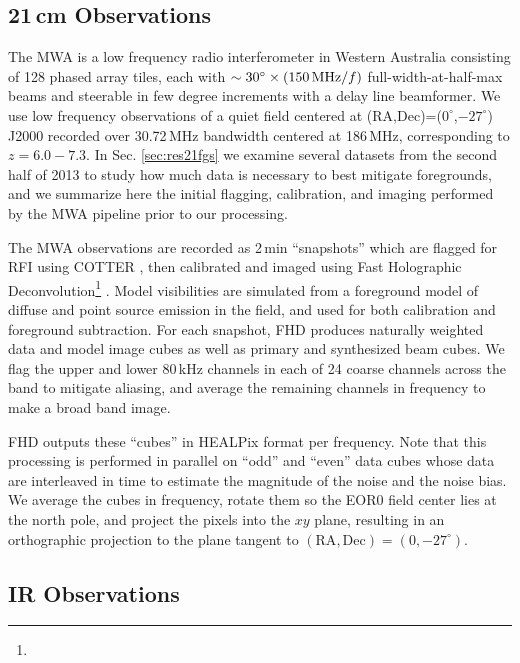 \documentclass{emulateapj}
\begin{document}
\subsection{21\,cm Observations}
\label{sec:mwaobservations}

The MWA is a low frequency radio interferometer in Western Australia consisting of 128 phased array tiles, each with $\sim30^\circ\times(150\text{\,MHz}/f)$ full-width-at-half-max beams and steerable in few degree increments with a delay line beamformer. We use low frequency observations of a quiet field centered at (RA,Dec)=($0^\circ$,$-27^\circ$) J2000 recorded over 30.72\,MHz bandwidth centered at 186\,MHz, corresponding to $z=6.0-7.3$. In Sec. \ref{sec:res21fgs} we examine several datasets from the second half of 2013 to study how much data is necessary to best mitigate foregrounds, and we summarize here the initial flagging, calibration, and imaging performed by the MWA pipeline prior to our processing. 

The MWA observations are recorded as 2\,min ``snapshots'' which are flagged for RFI using COTTER \citep{AndreMWARFI}, then calibrated and imaged using Fast Holographic Deconvolution\footnote{} \citep{fhd}. Model visibilities are simulated from a foreground model of diffuse \citep{beardsley16} and point source \citep{PattiCatalog1} emission in the field, and used for both calibration and foreground subtraction. For each snapshot, FHD produces naturally weighted data and model image cubes as well as primary and synthesized beam cubes. We flag the upper and lower 80\,kHz channels in each of 24 coarse channels across the band to mitigate aliasing, and average the remaining channels in frequency to make a broad band image. 

FHD outputs these ``cubes'' in HEALPix format per frequency. Note that this processing is performed in parallel on ``odd'' and ``even'' data cubes whose data are interleaved in time to estimate the magnitude of the noise and the noise bias. We average the cubes in frequency, rotate them so the EOR0 field center lies at the north pole, and project the pixels into the $xy$ plane, resulting in an orthographic projection to the plane tangent to  $(\text{RA}, \text{Dec})=(0,-27^\circ)$.

\subsection{IR Observations}
\end{document}
